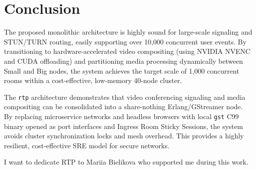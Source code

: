 \documentclass{article}
\begin{document}
\section{Conclusion}

The proposed monolithic architecture is highly sound for large-scale signaling and STUN/TURN routing,
easily supporting over 10,000 concurrent user events. By transitioning to hardware-accelerated video
compositing (using NVIDIA NVENC and CUDA offloading) and partitioning media processing dynamically
between Small and Big nodes, the system achieves the target scale of 1,000 concurrent rooms within
a cost-effective, low-memory 40-node cluster.

The \texttt{rtp} architecture demonstrates that video conferencing signaling and media compositing
can be consolidated into a share-nothing Erlang/GStreamer node. By replacing microservice networks
and headless browsers with local \texttt{gst} C99 binary opened as port interfaces and Ingress Room Sticky Sessions, the system
avoids cluster synchronization locks and mesh overhead. This provides a highly resilient, cost-effective
SRE model for secure networks.

I want to dedicate RTP to Mariia Bielikova who supported me during this work.
\end{document}

